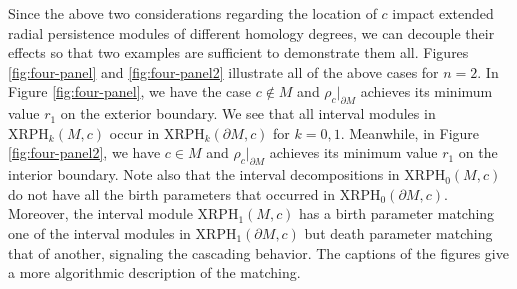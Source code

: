 \documentclass[a4paper,11pt]{article}
\theoremstyle{definition}
\begin{document}
Since the above two considerations regarding the location of $c$ impact extended radial persistence modules of different homology degrees, we can decouple their effects so that two examples are sufficient to demonstrate them all. Figures \ref{fig:four-panel} and \ref{fig:four-panel2} illustrate all of the above cases for $n=2$. In Figure \ref{fig:four-panel}, we have the case $c\notin M$ and $\rho_c\vert_{\partial M}$ achieves its minimum value $r_1$ on the exterior boundary.  We see that all interval modules in $\mathrm{XRPH}_k(M,c)$ occur in $\mathrm{XRPH}_k(\partial M,c)$ for $k=0,1$.  
Meanwhile, in Figure \ref{fig:four-panel2}, we have $c\in M$ and $\rho_c\vert_{\partial M}$ achieves its minimum value $r_1$ on the interior boundary. Note also that the interval decompositions in $\mathrm{XRPH}_0(M,c)$ do not have all the birth parameters that occurred in $\mathrm{XRPH}_0(\partial M,c)$. Moreover, the interval module $\mathrm{XRPH}_1(M,c)$ has a birth parameter matching one of the interval modules in $\mathrm{XRPH}_1(\partial M,c)$ but death parameter matching that of another, signaling the cascading behavior. The captions of the figures give a more algorithmic description of the matching.
\end{document}
